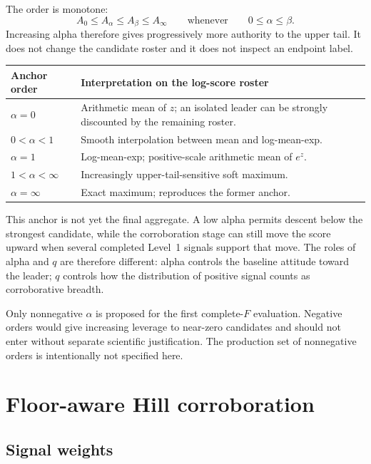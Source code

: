 \documentclass[11pt]{article}
\begin{document}
The order is monotone:
\[
A_0\leq A_\alpha\leq A_\beta\leq A_\infty
\qquad\text{whenever}\qquad 0\leq\alpha\leq\beta.
\]
Increasing alpha therefore gives progressively more authority to the upper
tail. It does not change the candidate roster and it does not inspect an
endpoint label.

\begin{center}
\small
\begin{tabularx}{0.92\textwidth}{@{}p{}>{\raggedright\arraybackslash}X@{}}
\toprule
Anchor order & Interpretation on the log-score roster \\
\midrule
$\alpha=0$ & Arithmetic mean of $z$; an isolated leader can be strongly
discounted by the remaining roster. \\
$0<\alpha<1$ & Smooth interpolation between mean and log-mean-exp. \\
$\alpha=1$ & Log-mean-exp; positive-scale arithmetic mean of $e^z$. \\
$1<\alpha<\infty$ & Increasingly upper-tail-sensitive soft maximum. \\
$\alpha=\infty$ & Exact maximum; reproduces the former anchor. \\
\bottomrule
\end{tabularx}
\end{center}

This anchor is not yet the final aggregate. A low alpha permits descent below
the strongest candidate, while the corroboration stage can still move the
score upward when several completed Level~1 signals support that move. The
roles of alpha and $q$ are therefore different: alpha controls the baseline
attitude toward the leader; $q$ controls how the distribution of positive
signal counts as corroborative breadth.

Only nonnegative $\alpha$ is proposed for the first complete-$F$ evaluation.
Negative orders would give increasing leverage to near-zero candidates and
should not enter without separate scientific justification. The production
set of nonnegative orders is intentionally not specified here.

\section{Floor-aware Hill corroboration}

\subsection{Signal weights}
\end{document}
